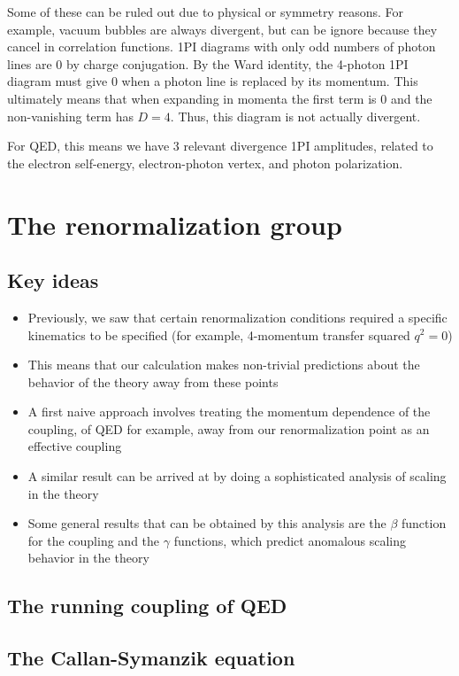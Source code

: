 \documentclass[12pt]{memoir}
\begin{document}
Some of these can be ruled out due to physical or symmetry reasons.
For example, vacuum bubbles are always divergent, but can be ignore because they cancel in correlation functions.
1PI diagrams with only odd numbers of photon lines are 0 by charge conjugation.
By the Ward identity, the 4-photon 1PI diagram must give 0 when a photon line is replaced by its momentum.
This ultimately means that when expanding in momenta the first term is 0 and the non-vanishing term has $D=4$.
Thus, this diagram is not actually divergent.

For QED, this means we have 3 relevant divergence 1PI amplitudes,
related to the electron self-energy, electron-photon vertex, and photon polarization.

\chapter{The renormalization group}

\section{Key ideas}

\begin{itemize}
  \item Previously, we saw that certain renormalization conditions required a specific kinematics to be specified
    (for example, 4-momentum transfer squared $q^2=0$)
  \item This means that our calculation makes non-trivial predictions about the behavior of the theory away from these points
  \item A first naive approach involves treating the momentum dependence of the coupling,
    of QED for example,
    away from our renormalization point as an effective coupling
  \item A similar result can be arrived at by doing a sophisticated analysis of scaling in the theory
  \item Some general results that can be obtained by this analysis are the $\beta$ function for the coupling
    and the $\gamma$ functions, which predict anomalous scaling behavior in the theory
\end{itemize}

\section{The running coupling of QED}

\section{The Callan-Symanzik equation}
\end{document}
